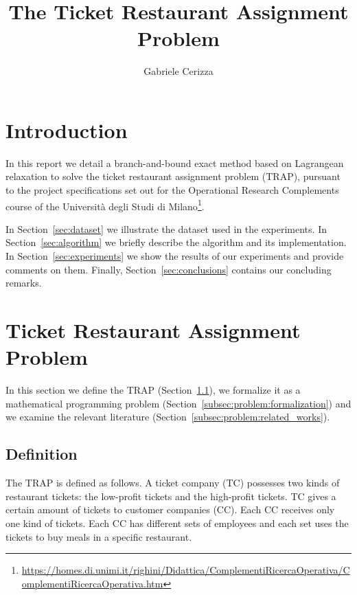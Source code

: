 \documentclass[runningheads]{llncs}
\begin{document}
\title{
  The Ticket Restaurant Assignment Problem
}
\author{Gabriele Cerizza}


\maketitle

\section*{Introduction}
\label{sec:introduction}

In this report we detail a branch-and-bound exact method based on Lagrangean relaxation to solve the ticket restaurant assignment problem (TRAP), pursuant to the project specifications set out for the Operational Research Complements course of the Università degli Studi di Milano\footnote{\url{https://homes.di.unimi.it/righini/Didattica/ComplementiRicercaOperativa/ComplementiRicercaOperativa.htm}}. 

In Section~\ref{sec:dataset} we illustrate the dataset used in the experiments. In Section~\ref{sec:algorithm} we briefly describe the algorithm and its implementation. In Section~\ref{sec:experiments} we show the results of our experiments and provide comments on them. Finally, Section~\ref{sec:conclusions} contains our concluding remarks. 

\section{Ticket Restaurant Assignment Problem}
\label{sec:problem}

In this section we define the TRAP (Section~\ref{subsec:problem:definition}), we formalize it as a mathematical programming problem (Section~\ref{subsec:problem:formalization}) and we examine the relevant literature (Section~\ref{subsec:problem:related_works}).

\subsection{Definition}
\label{subsec:problem:definition}

The TRAP is defined as follows. A ticket company (TC) possesses two kinds of restaurant tickets: the low-profit tickets and the high-profit tickets. TC gives a certain amount of tickets to customer companies (CC). Each CC receives only one kind of tickets. Each CC has different sets of employees and each set uses the tickets to buy meals in a specific restaurant.  
\end{document}
